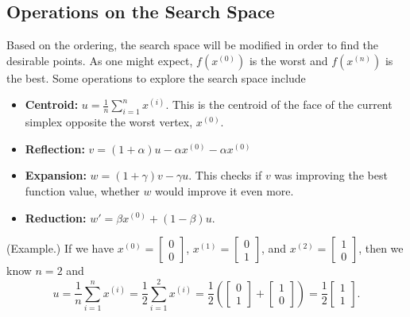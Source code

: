 \documentclass[letterpaper]{article}
\begin{document}
\subsection{Operations on the Search Space}
Based on the ordering, the search space will be modified in order to find the desirable points. As one might expect, $f(x^{(0)})$ is the worst and $f(x^{(n)})$ is the best. Some operations to explore the search space include 
\begin{itemize}
    \item \textbf{Centroid:} $u = \frac{1}{n} \sum_{i = 1}^{n} x^{(i)}$. This is the centroid of the face of the current simplex opposite the worst vertex, $x^{(0)}$. 
    \item \textbf{Reflection:} $v = (1 + \alpha)u - \alpha x^{(0)} - \alpha x^{(0)}$
    \item \textbf{Expansion:} $w = (1 + \gamma)v - \gamma u$. This checks if $v$ was improving the best function value, whether $w$ would improve it even more. 
    \item \textbf{Reduction:} $w' = \beta x^{(0)} + (1 - \beta) u$. 
\end{itemize}
\begin{mdframed}
    (Example.) If we have $x^{(0)} = \begin{bmatrix}
        0 \\ 0 
    \end{bmatrix}$, $x^{(1)} = \begin{bmatrix}
        0 \\ 1
    \end{bmatrix}$, and $x^{(2)} = \begin{bmatrix}
        1 \\ 0
    \end{bmatrix}$, then we know $n = 2$ and 
    \[u = \frac{1}{n} \sum_{i = 1}^{n} x^{(i)} = \frac{1}{2} \sum_{i = 1}^{2} x^{(i)} = \frac{1}{2} \left(\begin{bmatrix}
        0 \\ 1
    \end{bmatrix} + \begin{bmatrix}
        1 \\ 0
    \end{bmatrix}\right) = \frac{1}{2}\begin{bmatrix}
        1 \\ 1
    \end{bmatrix}.\]
\end{mdframed}
\end{document}
